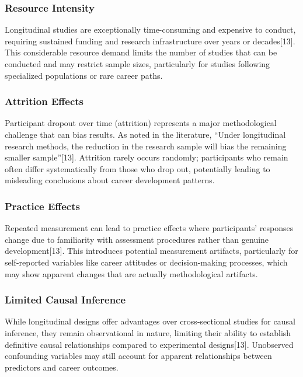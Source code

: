 \documentclass[
  letterpaper,
  DIV=11,
  numbers=noendperiod]{scrartcl}
\begin{document}
\subsubsection{Resource Intensity}\label{resource-intensity}

Longitudinal studies are exceptionally time-consuming and expensive to
conduct, requiring sustained funding and research infrastructure over
years or decades{[}13{]}. This considerable resource demand limits the
number of studies that can be conducted and may restrict sample sizes,
particularly for studies following specialized populations or rare
career paths.

\subsubsection{Attrition Effects}\label{attrition-effects}

Participant dropout over time (attrition) represents a major
methodological challenge that can bias results. As noted in the
literature, ``Under longitudinal research methods, the reduction in the
research sample will bias the remaining smaller sample''{[}13{]}.
Attrition rarely occurs randomly; participants who remain often differ
systematically from those who drop out, potentially leading to
misleading conclusions about career development patterns.

\subsubsection{Practice Effects}\label{practice-effects}

Repeated measurement can lead to practice effects where participants'
responses change due to familiarity with assessment procedures rather
than genuine development{[}13{]}. This introduces potential measurement
artifacts, particularly for self-reported variables like career
attitudes or decision-making processes, which may show apparent changes
that are actually methodological artifacts.

\subsubsection{Limited Causal Inference}\label{limited-causal-inference}

While longitudinal designs offer advantages over cross-sectional studies
for causal inference, they remain observational in nature, limiting
their ability to establish definitive causal relationships compared to
experimental designs{[}13{]}. Unobserved confounding variables may still
account for apparent relationships between predictors and career
outcomes.
\end{document}
